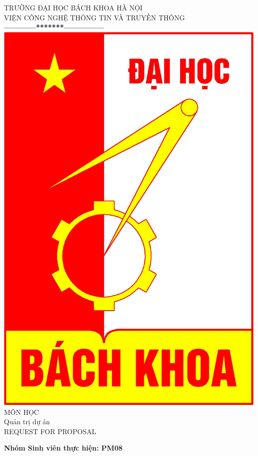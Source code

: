 \documentclass[a4paper,11pt]{report}
\begin{document}
\thispagestyle{empty}
\thisfancypage{
\setlength{\fboxrule}{1pt}
\doublebox}{}
\begin{center}
{\fontsize{16}{19}\selectfont TRƯỜNG ĐẠI HỌC BÁCH KHOA HÀ NỘI\\
VIỆN CÔNG NGHỆ THÔNG TIN VÀ TRUYỀN THÔNG}\\
\textbf{------------*******---------------}\\[1cm]
\includegraphics[scale=0.13]{hust.jpg}\\[1.3cm]

{\fontsize{38}{45}\selectfont MÔN HỌC}\\[0.2cm]
{\fontsize{19}{20}\selectfont Quản trị dự án}\\[1cm]
{\fontsize{17}{24}\selectfont REQUEST FOR PROPOSAL}\\[2cm]
\end{center}
\hspace{1cm}\fontsize{14}{16}\selectfont \textbf{Nhóm Sinh viên thực hiện: PM08}
\tableofcontents
\end{document}
